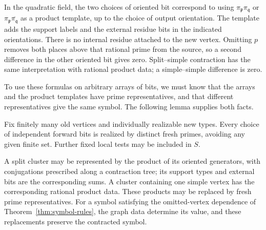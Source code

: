 In the quadratic field, the two choices of oriented bit correspond to
using $\pi_{\mathfrak p}\pi_{\mathfrak q}$ or
$\pi_{\mathfrak p}\overline{\pi_{\mathfrak q}}$ as a product template,
up to the choice of output orientation. The template adds the support
labels and the external residue bits in the indicated orientations.
There is no internal residue attached to the new vertex. Omitting $p$
removes both places above that rational prime from the source, so a
second difference in the other oriented bit gives zero. Split--simple
contraction has the same interpretation with rational product data;
a simple--simple difference is zero.

To use these formulas on arbitrary arrays of bits, we must know that
the arrays and the product templates have prime representatives, and
that different representatives give the same symbol. The following
lemma supplies both facts.

\begin{lemma}\label{gr:realization}
Fix finitely many old vertices and individually realizable new types.
Every choice of independent forward bits is realized by distinct fresh
primes, avoiding any given finite set.  Further fixed local tests may be
included in $S$.

A split cluster may be represented by the product of its oriented
generators, with conjugations prescribed along a contraction tree; its
support types and external bits are the corresponding sums.  A cluster
containing one simple vertex has the corresponding rational product data.
These products may be replaced by fresh prime representatives.  For a
symbol satisfying the omitted-vertex dependence of
Theorem~\ref{thm:symbol-rules}, the graph data determine its value, and
these replacements preserve the contracted symbol.
\end{lemma}

